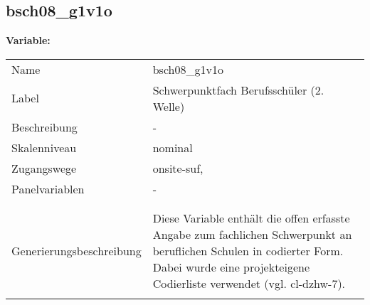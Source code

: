 	
	
	\subsection{bsch08\_g1v1o}
	\label{subSection:bsch08_g1v1o}

	\noindent\textbf{Variable:}\\
		\begin{tabular}{lL{11.3cm}}
			\label{tableVariable:bsch08_g1v1o}
			Name & bsch08\_g1v1o \\
			Label & Schwerpunktfach Berufsschüler (2. Welle) \\
			Beschreibung & - \\
			Skalenniveau & nominal \\
			Zugangswege &
				onsite-suf,
 \\
			Panelvariablen & -
			 \\
			 \\
 \\
					Generierungsbeschreibung & Diese Variable enthält die offen erfasste Angabe zum fachlichen Schwerpunkt an beruflichen Schulen in codierter Form. Dabei wurde eine projekteigene Codierliste verwendet (vgl. cl-dzhw-7).
				 \\	
			 \\
		\end{tabular}






